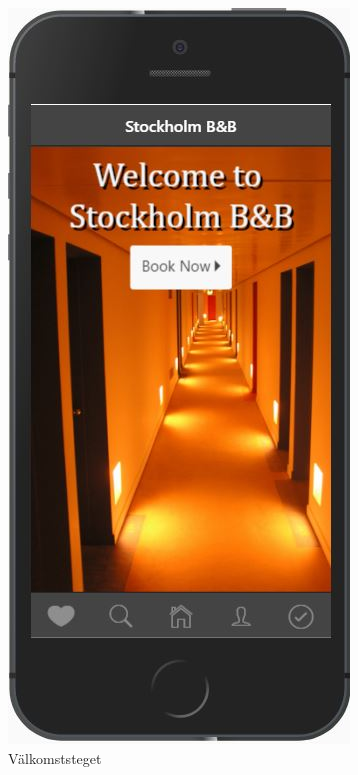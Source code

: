 \documentclass[a4paper]{article}
\begin{document}
\begin{figure}
\begin{subfigure}{.3\textwidth}
  \centering
  \includegraphics[width=.8\linewidth]{welcome.jpg}
  \caption{Välkomststeget}
  \label{fig:sfig1}
\end{subfigure}
\begin{subfigure}{.3\textwidth}
  \centering

\end{subfigure}
\end{figure}
\end{document}
